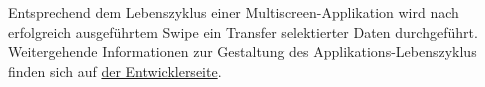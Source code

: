 {Entsprechend dem Lebenszyklus einer Multiscreen-Applikation wird nach erfolgreich ausgeführtem Swipe ein Transfer selektierter Daten durchgeführt. Weitergehende Informationen zur Gestaltung des Applikations-Lebenszyklus finden sich auf \href{http://141.19.142.50/sysplace/}{der Entwicklerseite}.
}




\newcommand{\authors}{
Alexander Hahn, Hochschule Mannheim  \\
Valentina Burjan, Hochschule Mannheim \\
Dominick Madden, Hochschule Mannheim \\
Horst Schneider, Hochschule Mannheim}

\newcommand{\figures}{---}
\newcommand{\versionhistory}{12.05.2016}
\newcommand{\dateofcreation}{17.09.2015}
\newcommand{\comments}{---}
\newcommand{\questions}{---}



